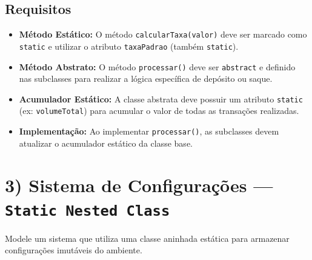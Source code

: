 \documentclass[12pt]{article}
\begin{document}
\subsection*{Requisitos}
\begin{itemize}
    \item \textbf{Método Estático:} O método \texttt{calcularTaxa(valor)} deve ser marcado como \texttt{static} e utilizar o atributo \texttt{taxaPadrao} (também \texttt{static}).
    \item \textbf{Método Abstrato:} O método \texttt{processar()} deve ser \texttt{abstract} e definido nas subclasses para realizar a lógica específica de depósito ou saque.
    \item \textbf{Acumulador Estático:} A classe abstrata deve possuir um atributo \texttt{static} (ex: \texttt{volumeTotal}) para acumular o valor de todas as transações realizadas.
    \item \textbf{Implementação:} Ao implementar \texttt{processar()}, as subclasses devem atualizar o acumulador estático da classe base.
\end{itemize}

\section*{3) Sistema de Configurações — \texttt{Static Nested Class}}
Modele um sistema que utiliza uma classe aninhada estática para armazenar configurações imutáveis do ambiente.

\begin{center}
\end{center}
\end{document}
